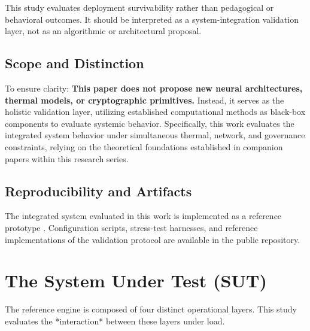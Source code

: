 \documentclass[conference]{IEEEtran}
\begin{document}
This study evaluates deployment survivability rather than pedagogical or behavioral outcomes. It should be interpreted as a system-integration validation layer, not as an algorithmic or architectural proposal.

\subsection{Scope and Distinction}
To ensure clarity: \textbf{This paper does not propose new neural architectures, thermal models, or cryptographic primitives.} Instead, it serves as the holistic validation layer, utilizing established computational methods as black-box components to evaluate systemic behavior. Specifically, this work evaluates the integrated system behavior under simultaneous thermal, network, and governance constraints, relying on the theoretical foundations established in companion papers within this research series.

\subsection{Reproducibility and Artifacts}
The integrated system evaluated in this work is implemented as a reference prototype \cite{scholarmaster_repo}. Configuration scripts, stress-test harnesses, and reference implementations of the validation protocol are available in the public repository.

\section{The System Under Test (SUT)}
The reference engine is composed of four distinct operational layers. This study evaluates the *interaction* between these layers under load. 
\end{document}
